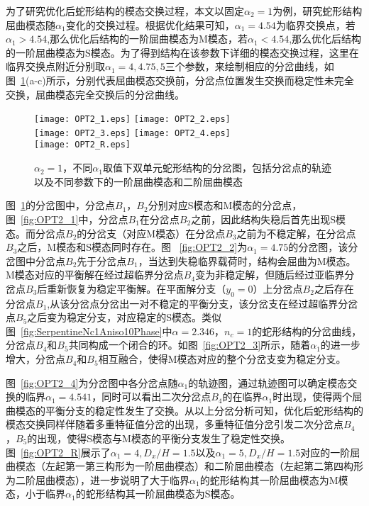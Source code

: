 为了研究优化后蛇形结构的模态交换过程，本文以固定$\alpha_2=1$为例，研究蛇形结构屈曲模态随$\alpha_1$变化的交换过程。根据优化结果可知，$\alpha_1=4.54$为临界交换点，若$\alpha_1>4.54$,那么优化后结构的一阶屈曲模态为M模态，若$\alpha_1<4.54$,那么优化后结构的一阶屈曲模态为S模态。为了得到结构在该参数下详细的模态交换过程，这里在临界交换点附近分别取$\alpha_1=4,4.75,5$三个参数，来绘制相应的分岔曲线，如图~\ref{fig:OPT2_Bifurcation}(a-c)所示，分别代表屈曲模态交换前，分岔点位置发生交换而稳定性未完全交换，屈曲模态完全交换后的分岔曲线。
\begin{figure}
	\centering
	{\texttt{[image: OPT2\_1.eps]}}
	{\texttt{[image: OPT2\_2.eps]}}\\
    {\texttt{[image: OPT2\_3.eps]}}
    {\texttt{[image: OPT2\_4.eps]}}\\
    {\texttt{[image: OPT2\_R.eps]}}    
    \caption{$\alpha_2=1$，不同$\alpha_1$	​
    	取值下双单元蛇形结构的分岔图，包括分岔点的轨迹以及不同参数下的一阶屈曲模态和二阶屈曲模态}	
	\label{fig:OPT2_Bifurcation}
\end{figure}

图~\ref{fig:OPT2_Bifurcation}的分岔图中，分岔点$B_1$，$B_2$分别对应S模态和M模态的分岔点，图~\ref{fig:OPT2_1}中，分岔点$B_1$在分岔点$B_2$之前，因此结构失稳后首先出现S模态。而分岔点$B_2$的分岔支（对应M模态）在分岔点$B_3$之前为不稳定解，在分岔点$B_3$之后，M模态和S模态同时存在。图 ~\ref{fig:OPT2_2}为$\alpha_1=4.75$的分岔图，该分岔图中分岔点$B_2$先于分岔点$B_1$，当达到失稳临界载荷时，结构会屈曲为M模态。M模态对应的平衡解在经过超临界分岔点$B_4$变为非稳定解，但随后经过亚临界分岔点$B_3$后重新恢复为稳定平衡解。在平面解分支（$y_0=0$）上分岔点$B_2$之后存在分岔点$B_1$,从该分岔点分岔出一对不稳定的平衡分支，该分岔支在经过超临界分岔点$B_5$之后变为稳定分支，对应稳定的S模态。类似图~\ref{fig:SerpentineNc1Aniso10Phase}中$\alpha=2.346$，$n_c=1$的蛇形结构的分岔曲线，分岔点$B_4$和$B_5$共同构成一个闭合的环。如图~\ref{fig:OPT2_3}所示，随着$\alpha_1$的进一步增大，分岔点$B_4$和$B_5$相互融合，使得M模态对应的整个分岔支变为稳定分支。

图~\ref{fig:OPT2_4}为分岔图中各分岔点随$\alpha_1$的轨迹图，通过轨迹图可以确定模态交换的临界$\alpha_1=4.541$，同时可以看出二次分岔点$B_4$的在临界$\alpha_1$时出现，使得两个屈曲模态的平衡分支的稳定性发生了交换。从以上分岔分析可知，优化后蛇形结构的模态交换同样伴随着多重特征值分岔的出现，多重特征值分岔引发二次分岔点$B_4$，$B_5$的出现，使得S模态与M模态的平衡分支发生了稳定性交换。图~\ref{fig:OPT2_R}展示了$\alpha_1=4,D_x/H=1.5$以及$\alpha_1=5,D_x/H=1.5$对应的一阶屈曲模态（左起第一第三构形为一阶屈曲模态）和二阶屈曲模态（左起第二第四构形为二阶屈曲模态），进一步说明了大于临界$\alpha_1$的蛇形结构其一阶屈曲模态为M模态，小于临界$\alpha_1$的蛇形结构其一阶屈曲模态为S模态。
